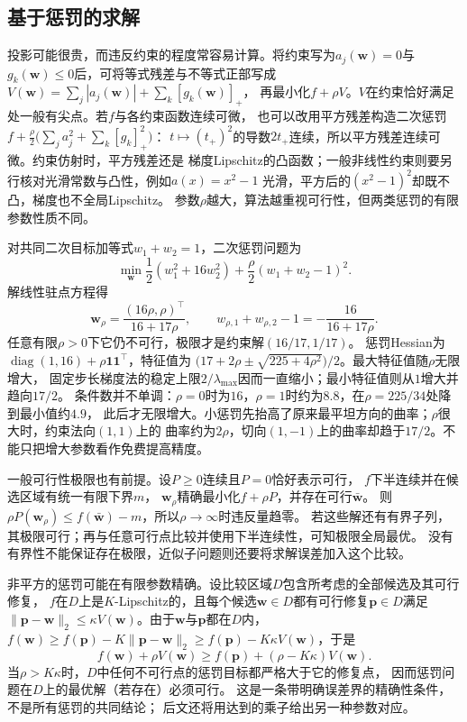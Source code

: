 \subsection{基于惩罚的求解}
\label{sec:opt-penalty-methods}

投影可能很贵，而违反约束的程度常容易计算。将约束写为$a_j(\bm w)=0$与$g_k(\bm w)\leq0$后，可将等式残差与不等式正部写成
$V(\bm w)=\sum_j|a_j(\bm w)|+\sum_k[g_k(\bm w)]_+$，
再最小化$f+\rho V$。$V$在约束恰好满足处一般有尖点。若$f$与各约束函数连续可微，
也可以改用平方残差构造二次惩罚$f+\frac\rho2\bigl(\sum_ja_j^2+\sum_k[g_k]_+^2\bigr)$：
$t\mapsto(t_+)^2$的导数$2t_+$连续，所以平方残差连续可微。约束仿射时，平方残差还是
梯度Lipschitz的凸函数；一般非线性约束则要另行核对光滑常数与凸性，例如$a(x)=x^2-1$
光滑，平方后的$(x^2-1)^2$却既不凸，梯度也不全局Lipschitz。
参数$\rho$越大，算法越重视可行性，但两类惩罚的有限参数性质不同。

对共同二次目标加等式$w_1+w_2=1$，二次惩罚问题为
\[
 \min_{\bm w}\frac12(w_1^2+16w_2^2)
 +\frac\rho2(w_1+w_2-1)^2.
\]
解线性驻点方程得
\[
 \bm w_\rho=\frac{(16\rho,\rho)^\top}{16+17\rho},\qquad
 w_{\rho,1}+w_{\rho,2}-1=-\frac{16}{16+17\rho}.
\]
任意有限$\rho>0$下它仍不可行，极限才是约束解$(16/17,1/17)$。
惩罚Hessian为$\operatorname{diag}(1,16)+\rho\bm 1\bm 1^\top$，特征值为
$\bigl(17+2\rho\pm\sqrt{225+4\rho^2}\bigr)/2$。最大特征值随$\rho$无限增大，
固定步长梯度法的稳定上限$2/\lambda_{\max}$因而一直缩小；最小特征值则从$1$增大并趋向$17/2$。
条件数并不单调：$\rho=0$时为$16$，$\rho=1$时约为$8.8$，在$\rho=225/34$处降到最小值约$4.9$，
此后才无限增大。小惩罚先抬高了原来最平坦方向的曲率；$\rho$很大时，约束法向$(1,1)$上的
曲率约为$2\rho$，切向$(1,-1)$上的曲率却趋于$17/2$。不能只把增大参数看作免费提高精度。

一般可行性极限也有前提。设$P\geq0$连续且$P=0$恰好表示可行，
$f$下半连续并在候选区域有统一有限下界$m$，
$\bm w_\rho$精确最小化$f+\rho P$，并存在可行$\bar{\bm w}$。
则$\rho P(\bm w_\rho)\leq f(\bar{\bm w})-m$，所以$\rho\to\infty$时违反量趋零。
若这些解还有有界子列，其极限可行；再与任意可行点比较并使用下半连续性，可知极限全局最优。
没有有界性不能保证存在极限，近似子问题则还要将求解误差加入这个比较。

非平方的惩罚可能在有限参数精确。设比较区域$D$包含所考虑的全部候选及其可行修复，
$f$在$D$上是$K$-Lipschitz的，且每个候选$\bm w\in D$都有可行修复$\bm p\in D$满足
$\|\bm p-\bm w\|_2\leq\kappa V(\bm w)$。由于$\bm w$与$\bm p$都在$D$内，
$f(\bm w)\geq f(\bm p)-K\|\bm p-\bm w\|_2\geq f(\bm p)-K\kappa V(\bm w)$，于是
\[
 f(\bm w)+\rho V(\bm w)
 \geq f(\bm p)+(\rho-K\kappa)V(\bm w).
\]
当$\rho>K\kappa$时，$D$中任何不可行点的惩罚目标都严格大于它的修复点，
因而惩罚问题在$D$上的最优解（若存在）必须可行。
这是一条带明确误差界的精确性条件，不是所有惩罚的共同结论；
后文还将用达到的乘子给出另一种参数对应。

